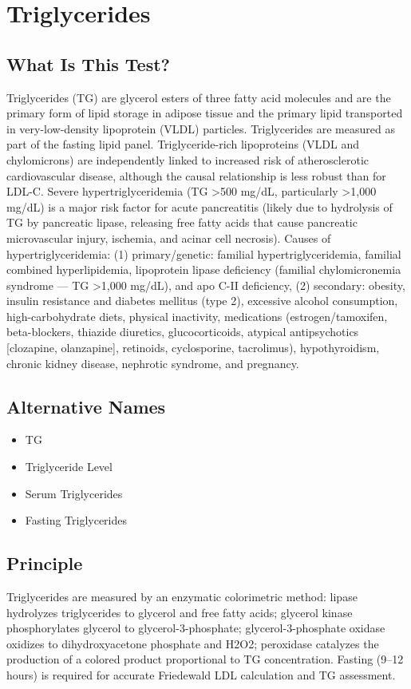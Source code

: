 \chapter{Triglycerides}
\section*{What Is This Test?}
Triglycerides (TG) are glycerol esters of three fatty acid molecules and are the primary form of lipid storage in adipose tissue and the primary lipid transported in very-low-density lipoprotein (VLDL) particles. Triglycerides are measured as part of the fasting lipid panel. Triglyceride-rich lipoproteins (VLDL and chylomicrons) are independently linked to increased risk of atherosclerotic cardiovascular disease, although the causal relationship is less robust than for LDL-C. Severe hypertriglyceridemia (TG >500 mg/dL, particularly >1,000 mg/dL) is a major risk factor for acute pancreatitis (likely due to hydrolysis of TG by pancreatic lipase, releasing free fatty acids that cause pancreatic microvascular injury, ischemia, and acinar cell necrosis). Causes of hypertriglyceridemia: (1) primary/genetic: familial hypertriglyceridemia, familial combined hyperlipidemia, lipoprotein lipase deficiency (familial chylomicronemia syndrome --- TG >1,000 mg/dL), and apo C-II deficiency, (2) secondary: obesity, insulin resistance and diabetes mellitus (type 2), excessive alcohol consumption, high-carbohydrate diets, physical inactivity, medications (estrogen/tamoxifen, beta-blockers, thiazide diuretics, glucocorticoids, atypical antipsychotics [clozapine, olanzapine], retinoids, cyclosporine, tacrolimus), hypothyroidism, chronic kidney disease, nephrotic syndrome, and pregnancy.
\section*{Alternative Names}
\begin{itemize}
  \item TG
  \item Triglyceride Level
  \item Serum Triglycerides
  \item Fasting Triglycerides
\end{itemize}
\section*{Principle}
Triglycerides are measured by an enzymatic colorimetric method: lipase hydrolyzes triglycerides to glycerol and free fatty acids; glycerol kinase phosphorylates glycerol to glycerol-3-phosphate; glycerol-3-phosphate oxidase oxidizes to dihydroxyacetone phosphate and H2O2; peroxidase catalyzes the production of a colored product proportional to TG concentration. Fasting (9--12 hours) is required for accurate Friedewald LDL calculation and TG assessment.
